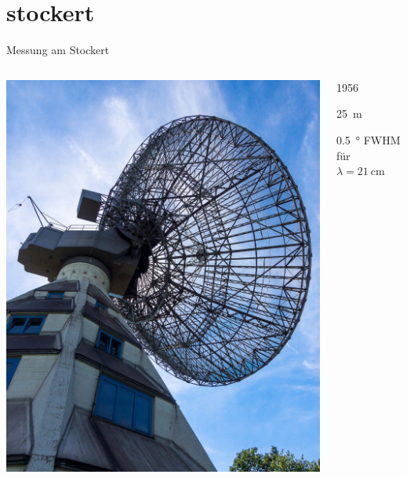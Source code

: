 \section{stockert}
\begin{frame}{Messung am Stockert}
  \begin{columns}[c, onlytextwidth]
    \begin{column}{0.4\textwidth}
      \includegraphics[width=\linewidth]{images/stockert_crop.jpg}
    \end{column}
    \begin{column}{0.55\textwidth}
      \begin{description}[Durchmesser]
        \item[Baujahr] 1956
        \item[Durchmesser] \SI{25}{\meter}
        \item[Auflösung]  \SI{0.5}{\degree} FWHM für $λ = \SI{21}{\centi\meter}$
      \end{description}
    \end{column}
  \end{columns}
\end{frame}
